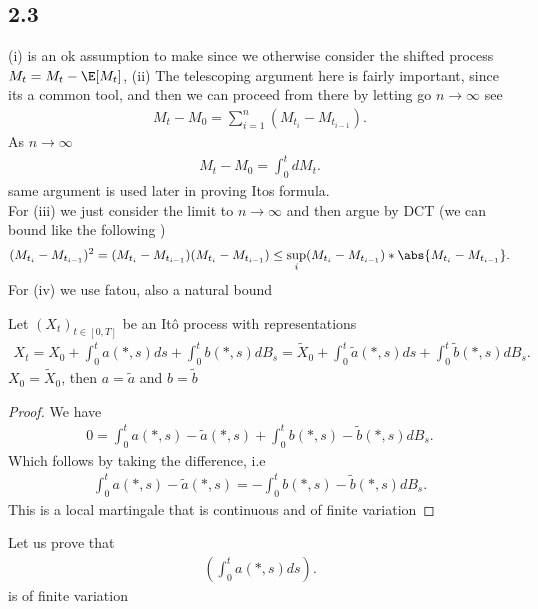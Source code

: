 \subsection*{2.3}
(i) is an ok assumption to make since we otherwise consider the shifted process $M_t = M_t - \E[M_t]$,
(ii) The telescoping argument here is fairly important, since its a common tool, and then we can proceed from there by letting go $n\to \infty$ see 
\begin{align*}
  M_t - M_0 = \sum_{i=1}^{n} (M_{t_i}-M_{t_{i-1}}) 
.\end{align*}
As $n\to \infty$ 
\begin{align*}
  M_t - M_0 = \int_0^{t} dM_t  
.\end{align*}
same argument is used later in proving Itos formula. \\[1ex]
For (iii) we just consider the limit to $n \to \infty$ and then argue by DCT (we can bound like the following )
\begin{align*}
  (M_{t_i} - M_{t_{i-1}})^2 = (M_{t_i} - M_{t_{i-1}})(M_{t_i} - M_{t_{i-1}}) \le \sup_{i} (M_{t_i} - M_{t_{i-1}}) * \abs{M_{t_i} - M_{t_{i-1}}}
.\end{align*}
For (iv) we use fatou, also a natural bound
\begin{lemma}
  Let $(X_t)_{t \in  [0,T]}$  be an It\^o process with representations 
  \begin{align*}
    X_t = X_{0} + \int_0^{t} a(*,s) ds + \int_0^{t} b(*,s) dB_s = \tilde{X}_0 + \int_0^{t} \tilde{a}(*,s) ds + \int_0^{t} \tilde{b}(*,s)dB_s      
  .\end{align*}
  $X_0 = \tilde{X}_0 $, then $a = \tilde{a} $ and $b = \tilde{b} $
\end{lemma}
\begin{proof}
 We have 
 \begin{align*}
  0 =  \int_0^{t} a(*,s) - \tilde{a}(*,s)  +   \int_0^{t} b(*,s)-\tilde{b}(*,s)  dB_s
 .\end{align*}
 Which follows by taking the difference, i.e 
 \begin{align*}
   \int_0^{t} a(*,s) - \tilde{a}(*,s)  = -  \int_0^{t} b(*,s)-\tilde{b}(*,s)  dB_s
 .\end{align*}
  This is a local martingale that is continuous and of finite variation
\end{proof}
Let us prove that 
\begin{align*}
  (\int_0^{t} a(*,s) ds )
.\end{align*}
is of finite variation
